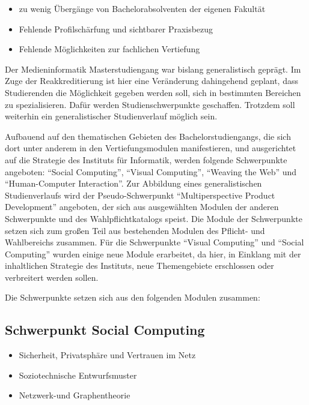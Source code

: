 \begin{itemize}
\tightlist
\item
  zu wenig Übergänge von Bachelorabsolventen der eigenen Fakultät
\item
  Fehlende Profilschärfung und sichtbarer Praxisbezug
\item
  Fehlende Möglichkeiten zur fachlichen Vertiefung
\end{itemize}

Der Medieninformatik Masterstudiengang war bislang generalistisch
geprägt. Im Zuge der Reakkreditierung ist hier eine Veränderung
dahingehend geplant, dass Studierenden die Möglichkeit gegeben werden
soll, sich in bestimmten Bereichen zu spezialisieren. Dafür werden
Studienschwerpunkte geschaffen. Trotzdem soll weiterhin ein
generalistischer Studienverlauf möglich sein.

Aufbauend auf den thematischen Gebieten des Bachelorstudiengangs, die
sich dort unter anderem in den Vertiefungsmodulen manifestieren, und
ausgerichtet auf die Strategie des Instituts für Informatik, werden
folgende Schwerpunkte angeboten: ``Social Computing'', ``Visual
Computing'', ``Weaving the Web'' und ``Human-Computer Interaction''. Zur
Abbildung eines generalistischen Studienverlaufs wird der
Pseudo-Schwerpunkt ``Multiperspective Product Development'' angeboten,
der sich aus ausgewählten Modulen der anderen Schwerpunkte und des
Wahlpflichtkatalogs speist. Die Module der Schwerpunkte setzen sich zum
großen Teil aus bestehenden Modulen des Pflicht- und Wahlbereichs
zusammen. Für die Schwerpunkte ``Visual Computing'' und ``Social
Computing'' wurden einige neue Module erarbeitet, da hier, in Einklang
mit der inhaltlichen Strategie des Instituts, neue Themengebiete
erschlossen oder verbreitert werden sollen.

Die Schwerpunkte setzen sich aus den folgenden Modulen zusammen:

\subsection{Schwerpunkt Social
Computing}\label{schwerpunkt-social-computing}

\begin{itemize}
\tightlist
\item
  Sicherheit, Privatsphäre und Vertrauen im Netz
\item
  Soziotechnische Entwurfsmuster
\item
  Netzwerk-und Graphentheorie
\end{itemize}

